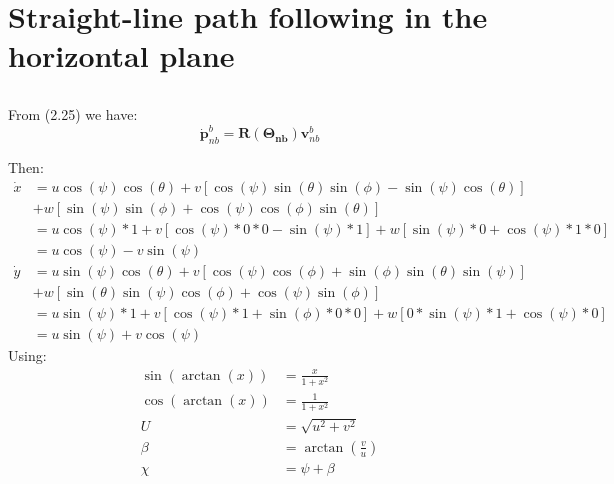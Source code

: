 \section{Straight-line path following in the horizontal plane}
\subsection{}
From (2.25) we have: 
\begin{equation}
	\dot{\mathbf{p}}^b_{nb} = \mathbf{R}(\mathbf{\Theta_{nb}}) \mathbf{v}^b_{nb}
\end{equation}

Then: 
\begin{align*}
	\dot{x} &= u \cos(\psi) \cos (\theta) + v [\cos (\psi) \sin( \theta) \sin (\phi) - \sin (\psi) \cos (\theta)] \\
	&+ w [\sin (\psi) \sin (\phi) + \cos (\psi) \cos (\phi) \sin(\theta)] \\
	&= u \cos(\psi) * 1 + v [\cos (\psi) * 0 * 0 - \sin (\psi) * 1] + w [\sin (\psi) * 0 + \cos (\psi) * 1 * 0] \\
	&= u \cos(\psi) - v \sin(\psi) \\
	\dot{y} &= u \sin (\psi) \cos (\theta) 
	+ v [\cos (\psi) \cos (\phi) + \sin (\phi) \sin (\theta) \sin (\psi)] \\
	&+ w [\sin (\theta) \sin (\psi) \cos (\phi) + \cos(\psi) \sin(\phi)] \\ 
	&= u \sin (\psi) * 1
	+ v [\cos (\psi) * 1 + \sin (\phi) * 0 * 0] 
	+ w [0 * \sin (\psi) * 1 + \cos(\psi) * 0] \\ 
	&= u \sin (\psi) + v \cos (\psi) 
\end{align*}
Using: 
\begin{align}
	\sin (\arctan (x)) &= \frac{x}{1 + x^2} \\
	\cos (\arctan (x)) &= \frac{1}{1 + x^2} \\ 
	U &= \sqrt{u^2 + v^2} \\ 
	\beta &= \arctan(\frac{v}{u}) \\
	\chi &= \psi + \beta 
\end{align}

